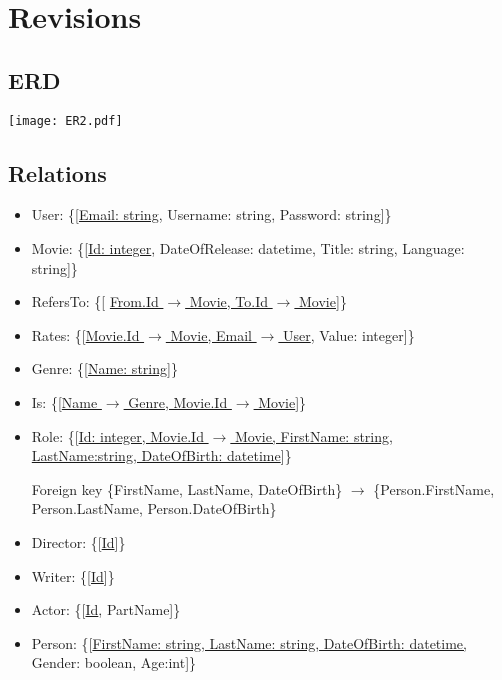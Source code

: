\section{Revisions}

\subsection{ERD}
\texttt{[image: ER2.pdf]}

\subsection{Relations}
\begin{itemize}
\item User: \{[\underline{Email: string}, Username: string, Password: string]\}

\item Movie: \{[\underline{Id: integer}, DateOfRelease: datetime, Title: string, Language: string]\}

\item RefersTo: \{[ \underline{From.Id $\rightarrow$ Movie, To.Id $\rightarrow$ Movie}]\}

\item Rates: \{[\underline{Movie.Id $\rightarrow$ Movie, Email $ \rightarrow $ User}, Value: integer]\}

\item Genre: \{[\underline{Name: string}]\}

\item Is: \{[\underline{Name $\rightarrow$ Genre, Movie.Id $\rightarrow$ Movie}]\}

\item Role: \{[\underline{Id: integer, Movie.Id $\rightarrow$ Movie, FirstName: string},\\ \underline{LastName:string, DateOfBirth: datetime}]\}

Foreign key \{FirstName, LastName, DateOfBirth\} $ \rightarrow $ \{Person.FirstName, Person.LastName, Person.DateOfBirth\}

\item Director: \{[\underline{Id}]\}

\item Writer: \{[\underline{Id}]\}

\item Actor: \{[\underline{Id}, PartName]\}

\item Person: \{[\underline{FirstName: string, LastName: string, DateOfBirth: datetime,} Gender: boolean, Age:int]\}


\end{itemize}
